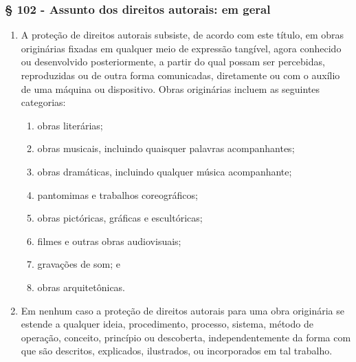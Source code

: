 \documentclass[a4paper, 12pt]{article}
\begin{document}
\subsubsection{§ 102 - Assunto dos direitos autorais: em geral}

\begin{enumerate}[label=(\alph*)]
	\item A proteção de direitos autorais subsiste, de acordo com este título, em obras originárias fixadas em qualquer meio de expressão tangível, agora conhecido ou desenvolvido posteriormente, a partir do qual possam ser percebidas, reproduzidas ou de outra forma comunicadas, diretamente ou com o auxílio de uma máquina ou dispositivo. Obras originárias incluem as seguintes categorias:
	\begin{enumerate}[label=(\arabic*)]
		\item obras literárias;
		\item obras musicais, incluindo quaisquer palavras acompanhantes;
		\item obras dramáticas, incluindo qualquer música acompanhante;
		\item pantomimas e trabalhos coreográficos;
		\item obras pictóricas, gráficas e escultóricas;
		\item filmes e outras obras audiovisuais;
		\item gravações de som; e
		\item obras arquitetônicas.
	\end{enumerate}
	\item Em nenhum caso a proteção de direitos autorais para uma obra originária se estende a qualquer ideia, procedimento, processo, sistema, método de operação, conceito, princípio ou descoberta, independentemente da forma com que são descritos, explicados, ilustrados, ou incorporados em tal trabalho.
\end{enumerate}
\end{document}
